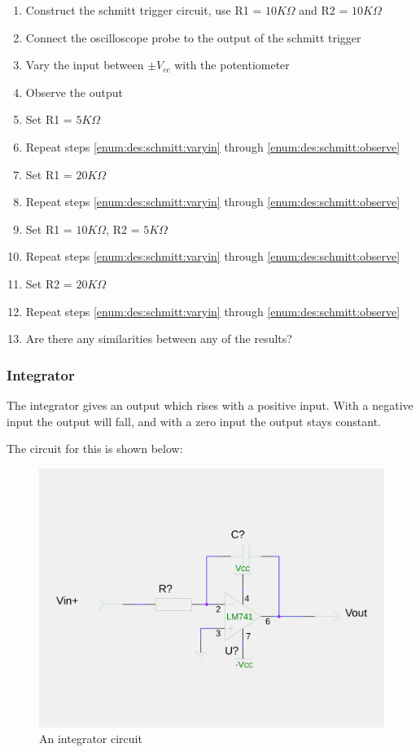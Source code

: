 \begin{enumerate}
\item Construct the schmitt trigger circuit, use R1 = $10K\Omega$ and R2 = $10K\Omega$
\item Connect the oscilloscope probe to the output of the schmitt trigger
\item \label{enum:des:schmitt:varyin} Vary the input between $\pm V_{cc}$ with the potentiometer
\item \label{enum:des:schmitt:observe} Observe the output
\item Set R1 = $5K\Omega$
\item Repeat steps \ref{enum:des:schmitt:varyin} through \ref{enum:des:schmitt:observe}
\item Set R1 = $20K\Omega$
\item Repeat steps \ref{enum:des:schmitt:varyin} through \ref{enum:des:schmitt:observe}
\item Set R1 = $10K\Omega$, R2 = $5K\Omega$
\item Repeat steps \ref{enum:des:schmitt:varyin} through \ref{enum:des:schmitt:observe}
\item Set R2 = $20K\Omega$
\item Repeat steps \ref{enum:des:schmitt:varyin} through \ref{enum:des:schmitt:observe}
\item Are there any similarities between any of the results?
\end{enumerate}

\subsubsection{Integrator}
The integrator gives an output which rises with a positive input.
With a negative input the output will fall, and with a zero input the output stays constant.

The circuit for this is shown below:

\begin{figure}[H]
	\centering
	\includegraphics[width=\textwidth]{./images/integrator.png}
	\caption{An integrator circuit}
	\label{fig:integrator}
\end{figure}

